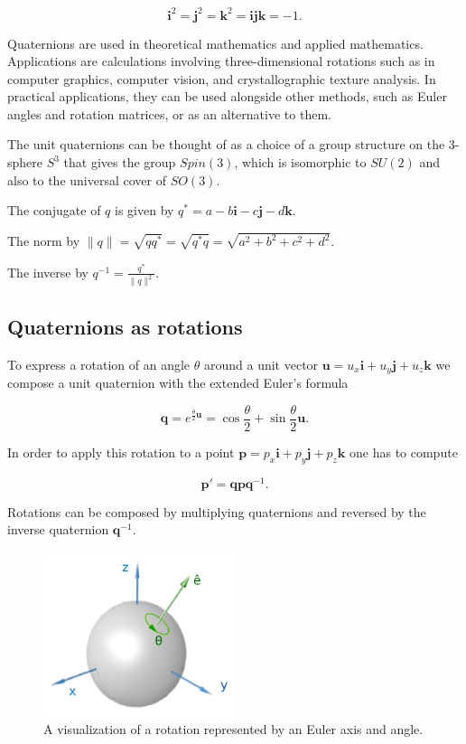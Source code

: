 \[\bm{i}^2 = \bm{j}^2 = \bm{k}^2 = \bm{ijk} = -1 \textrm{.}\]

Quaternions are used in theoretical mathematics and applied mathematics. Applications are calculations involving three-dimensional rotations such as in computer graphics, computer vision, and crystallographic texture analysis. In practical applications, they can be used alongside other methods, such as Euler angles and rotation matrices, or as an alternative to them.

The unit quaternions can be thought of as a choice of a group structure on the 3-sphere $S^3$ that gives the group $Spin(3)$, which is isomorphic to $SU(2)$ and also to the universal cover of $SO(3)$.

The conjugate of $q$ is given by $q^* = a - b \bm{i} - c \bm{j} - d \bm{k}$.

The norm by $\lVert q\rVert = \sqrt{qq^*} = \sqrt{q^{*}q} = \sqrt{a^2 + b^2 + c^2 + d^2}$.

The inverse by $q^{-1} = \frac{q^*}{\lVert q\rVert ^2}$.

\subsection{Quaternions as rotations}

To express a rotation of an angle $\theta$ around a unit vector $\bm{u} = u_x \bm{i} + u_y \bm{j} + u_z \bm{k}$ we compose a unit quaternion with the extended Euler's formula

\[\bm{q} = e^{{\frac{\theta}{2}}{\bm{u}}} = \cos{\frac{\theta}{2}} + \sin{\frac{\theta}{2} \bm{u}} \textrm{.}\]

In order to apply this rotation to a point $\bm{p} = p_x \bm{i} + p_y \bm{j} + p_z \bm{k}$ one has to compute

\[\bm{p}' = \bm{q} \bm{p} \bm{q}^{-1} \textrm{.}\]

Rotations can be composed by multiplying quaternions and reversed by the inverse quaternion $\bm{q}^{-1}$.

\begin{figure}[hbt!]
    \centering
    \includegraphics[width=0.5\textwidth]{figures/quaternion_rot.png}
    \caption{A visualization of a rotation represented by an Euler axis and angle.}
    \label{fig:quaternion_rot}
\end{figure}

